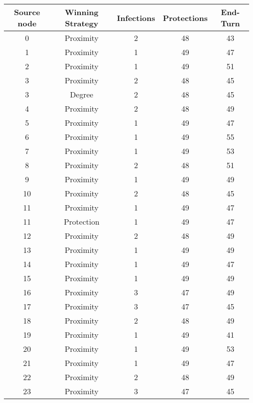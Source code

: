 \documentclass[results.tex]{subfiles}
\begin{document}
\begin{center}
  \begin{tabular}{| c || c | c | c | c |}
    \hline
    {\bfseries Source node} & {\bfseries Winning Strategy} & {\bfseries Infections} & {\bfseries Protections} & {\bfseries End-Turn} \\  %
    \hline\hline
    0 & Proximity & 2 & 48 & 43 \\ 
    \hline
    1 & Proximity & 1 & 49 & 47 \\ 
    \hline
    2 & Proximity & 1 & 49 & 51 \\ 
    \hline
    3 & Proximity & 2 & 48 & 45 \\ 
    \hline
    3 & Degree & 2 & 48 & 45 \\ 
    \hline
    4 & Proximity & 2 & 48 & 49 \\ 
    \hline
    5 & Proximity & 1 & 49 & 47 \\ 
    \hline
    6 & Proximity & 1 & 49 & 55 \\ 
    \hline
    7 & Proximity & 1 & 49 & 53 \\ 
    \hline
    8 & Proximity & 2 & 48 & 51 \\ 
    \hline
    9 & Proximity & 1 & 49 & 49 \\ 
    \hline
    10 & Proximity & 2 & 48 & 45 \\ 
    \hline
    11 & Proximity & 1 & 49 & 47 \\ 
    \hline
    11 & Protection & 1 & 49 & 47 \\ 
    \hline
    12 & Proximity & 2 & 48 & 49 \\ 
    \hline
    13 & Proximity & 1 & 49 & 49 \\ 
    \hline
    14 & Proximity & 1 & 49 & 47 \\ 
    \hline
    15 & Proximity & 1 & 49 & 49 \\ 
    \hline
    16 & Proximity & 3 & 47 & 49 \\ 
    \hline
    17 & Proximity & 3 & 47 & 45 \\ 
    \hline
    18 & Proximity & 2 & 48 & 49 \\ 
    \hline
    19 & Proximity & 1 & 49 & 41 \\ 
    \hline
    20 & Proximity & 1 & 49 & 53 \\ 
    \hline
    21 & Proximity & 1 & 49 & 47 \\ 
    \hline
    22 & Proximity & 2 & 48 & 49 \\ 
    \hline
    23 & Proximity & 3 & 47 & 45 \\ 

\end{tabular}
\end{center}
\end{document}
